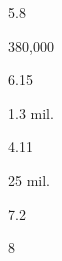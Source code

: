 \begin{description}[font=\normalfont,style=nextline]
\begin{multicols}{2}
\begin{description}[font=\normalfont\itshape,noitemsep]
 \item[] 
 \item[\pbnumberabbr] 5.8 
 \item[\family] \famNiloSaharan 
 \item[]
\item[\nativespeakers] 380,000 
 \item[\region] \regionChad\EnumComma\regionNiger\EnumComma\regionSudan\EnumComma\regionLibya 
 \end{description}\end{multicols}
\item[\langnameDinka] 
 \begin{multicols}{2}\begin{description}[font=\normalfont\itshape,noitemsep] 
 \item[] 
 \item[\pbnumberabbr] 6.15 
 \item[\family] \famNiloSaharan 
 \item[]
\item[\nativespeakers] 1.3 mil. 
 \item[\region] \regionSudan 
 \end{description}\end{multicols}
\item[\langnameDutch] 
 \begin{multicols}{2}\begin{description}[font=\normalfont\itshape,noitemsep] 
 \item[] 
 \item[\pbnumberabbr] 4.11 
 \item[\family] \famIndoEuropean 
 \item[]
\item[\nativespeakers] 25 mil. 
 \item[\region] \regionNetherlands 
 \end{description}\end{multicols}
\item[\langnameDyirbal] 
 \begin{multicols}{2}\begin{description}[font=\normalfont\itshape,noitemsep] 
 \item[] 
 \item[\pbnumberabbr] 7.2 
 \item[\family] \famPamaNyungan 
 \item[]
 \item[]
\item[\nativespeakers] 8 
 \item[\region] \regionNEQueensland\ \Brackets{\regionAustralia}

\end{description}
\end{multicols}
\end{description}
